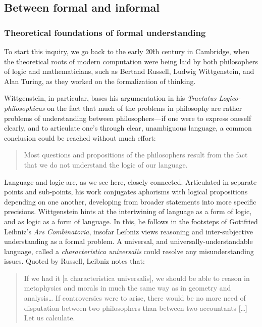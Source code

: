 \subsection{Between formal and informal} %

\subsubsection{Theoretical foundations of formal understanding}

To start this inquiry, we go back to the early 20\^{th} century in Cambridge, when the theoretical roots of modern computation were being laid by both philosophers of logic and mathematicians, such as Bertand Russell, Ludwig Wittgenstein, and Alan Turing, as they worked on the formalization of thinking.

Wittgenstein, in particular, bases his argumentation in his \emph{Tractatus Logico-philosophicus} on the fact that much of the problems in philosophy are rather problems of understanding between philosophers—if one were to express oneself clearly, and to articulate one's through clear, unambiguous language, a common conclusion could be reached without much effort:

\begin{quote}
    Most questions and propositions of the philosophers result from the fact that we do not understand the logic of our language. \citep{wittgenstein_tractatus_2010}
\end{quote}

Language and logic are, as we see here, closely connected. Articulated in separate points and sub-points, his work conjugates aphorisms with logical propositions depending on one another, developing from broader statements into more specific precisions. Wittgenstein hints at the intertwining of language as a form of logic, and as logic as a form of language. In this, he follows in the footsteps of Gottfried Leibniz's \emph{Ars Combinatoria}, insofar Leibniz views reasoning and inter-subjective understanding as a formal problem. A universal, and universally-understandable language, called a \emph{characteristica universalis} could resolve any misunderstanding issues. Quoted by Russell, Leibniz notes that:

\begin{quote}
    If we had it [a characteristica universalis], we should be able to reason in metaphysics and morals in much the same way as in geometry and analysis\dots{} If controversies were to arise, there would be no more need of disputation between two philosophers than between two accountants [\dots] Let us calculate. \citep{russell_logical_1950}
\end{quote}

